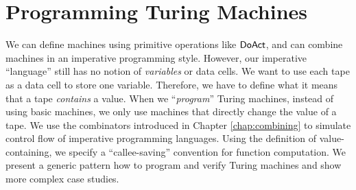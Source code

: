 \chapter{Programming Turing Machines}
\label{chap:programming}

We can define machines using primitive operations like $\textsf{DoAct}$, and can combine machines in an imperative programming style.  However, our
imperative ``language'' still has no notion of \emph{variables} or data cells.  We want to use each tape as a data cell to store one variable.
Therefore, we have to define what it means that a tape \emph{contains} a value.  When we ``\emph{program}'' Turing machines, instead of using basic
machines, we only use machines that directly change the value of a tape.  We use the combinators introduced in Chapter \ref{chap:combining} to
simulate control flow of imperative programming languages.  Using the definition of value-containing, we specify a ``callee-saving'' convention for
function computation.  We present a generic pattern how to program and verify Turing machines and show more complex case studies.



